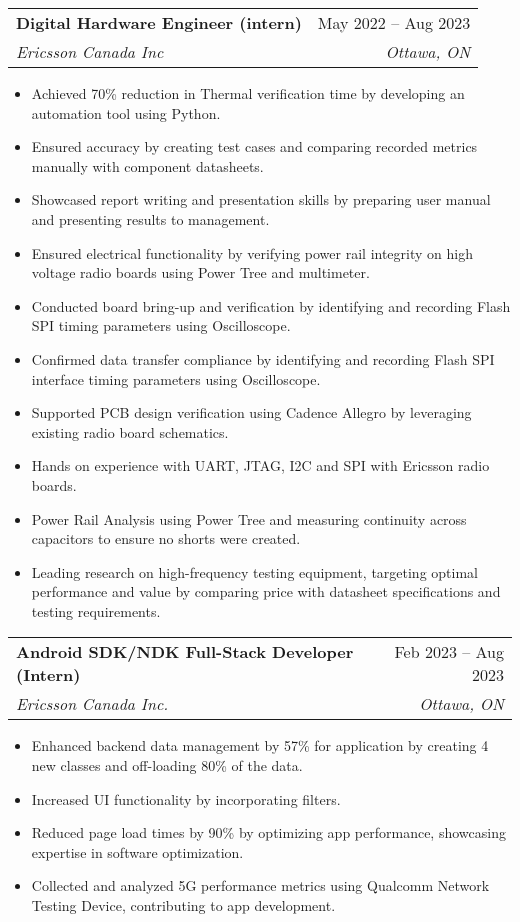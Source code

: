 \documentclass[A4,10pt]{article}
\makeatletter
\newcommand{\resumeItem}[1]{
  \item\small{
    {#1 \vspace{-2pt}}
  }
}
\newcommand{\resumeSubheading}[4]{
  \vspace{-2pt}\item
    \begin{tabular*}{0.97\textwidth}[t]{l@{\extracolsep{\fill}}r}
      \textbf{#1} & #2 \\
      \textit{\small#3} & \textit{\small #4} \\
    \end{tabular*}\vspace{-7pt}
}
\newcommand{\resumeSubSubheading}[2]{
    \item
    \begin{tabular*}{0.97\textwidth}{l@{\extracolsep{\fill}}r}
      \textit{\small#1} & \textit{\small #2} \\
    \end{tabular*}\vspace{-7pt}
}
\newcommand{\resumeSubHeadingListEnd}{\end{itemize}}
\newcommand{\resumeItemListStart}{\begin{itemize}}
\newcommand{\resumeItemListEnd}{\end{itemize}\vspace{-5pt}}
\makeatother
\begin{document}
    \resumeSubheading
      {Digital Hardware Engineer (intern)}{May 2022 -- Aug 2023}
      {Ericsson Canada Inc}{Ottawa, ON}
      \resumeItemListStart
        \resumeItem{Achieved 70\% reduction in Thermal verification time by developing an automation tool using Python.} %
        \resumeItem{Ensured accuracy by creating test cases and comparing recorded metrics manually with component datasheets.} %
        \resumeItem{Showcased report writing and presentation skills by preparing user manual and presenting results to management.} %
        \resumeItem{Ensured electrical functionality by verifying power rail integrity on high voltage radio boards using Power Tree and multimeter.} %
        \resumeItem{Conducted board bring-up and verification by identifying and recording Flash SPI timing parameters using Oscilloscope.} %
        \resumeItem{Confirmed data transfer compliance by identifying and recording Flash SPI interface timing parameters using Oscilloscope.}
        \resumeItem{Supported PCB design verification using Cadence Allegro by leveraging existing radio board schematics.} %
        \resumeItem{Hands on experience with UART, JTAG, I2C and SPI with Ericsson radio boards.} %
        \resumeItem{Power Rail Analysis using Power Tree and measuring continuity across capacitors to ensure no shorts were created.}
        \resumeItem{Leading research on high-frequency testing equipment, targeting optimal performance and value by comparing price with datasheet specifications and testing requirements.}
      \resumeItemListEnd
      


    \resumeSubheading
      {Android SDK/NDK Full-Stack Developer (Intern)}{Feb 2023 -- Aug 2023}
      {Ericsson Canada Inc.}{Ottawa, ON}
      \resumeItemListStart
        \resumeItem{Enhanced backend data management by 57\% for application by creating 4 new classes and off-loading 80\% of the data.}
        \resumeItem{Increased UI functionality by incorporating filters.}
        \resumeItem{Reduced page load times by 90\% by optimizing app performance, showcasing expertise in software optimization.} %
        \resumeItem{Collected and analyzed 5G performance metrics using Qualcomm Network Testing Device, contributing to app development.}
      \resumeItemListEnd
\end{document}
